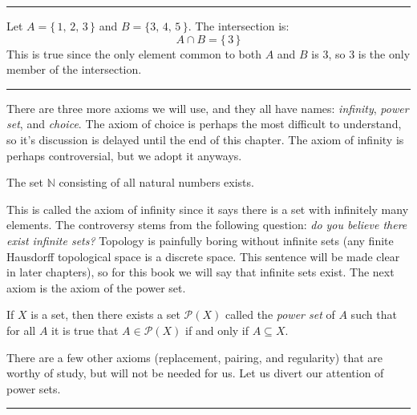             \hrule
            \begin{example}
                Let $A=\{\,1,\,2,\,3\,\}$ and $B=\{3,\,4,\,5\,\}$. The
                intersection is:
                \begin{equation}
                    A\cap{B}=\{\,3\,\}
                \end{equation}
                This is true since the only element common to both $A$ and
                $B$ is $3$, so $3$ is the only member of the intersection.
            \end{example}
            \hrule\par\hfill\par
            There are three more axioms we will use, and they all have names:
            \textit{infinity}, \textit{power set}, and \textit{choice}.
            The axiom of choice is perhaps the most difficult to understand,
            so it's discussion is delayed until the end of this chapter. The
            axiom of infinity is perhaps controversial, but we adopt it anyways.
            \begin{axiom}
                The set $\mathbb{N}$ consisting of all natural numbers exists.
            \end{axiom}
            This is called the axiom of infinity since it says there is a set
            with infinitely many elements. The controversy stems from the
            following question:
            \textit{do you believe there exist infinite sets?} Topology is
            painfully boring without infinite sets (any finite Hausdorff
            topological space is a discrete space. This sentence will be made
            clear in later chapters), so for this book we will
            say that infinite sets exist. The next axiom is the axiom of the
            power set.
            \begin{axiom}
                If $X$ is a set, then there exists a set
                $\mathcal{P}(X)$ called the \textit{power set} of $A$ such that
                for all $A$ it is true that $A\in\mathcal{P}(X)$ if and only if
                $A\subseteq{X}$.
            \end{axiom}
            There are a few other axioms (replacement, pairing, and regularity)
            that are worthy of study, but will not be needed for us. Let us
            divert our attention of power sets.
            \par\hfill\par\hrule
